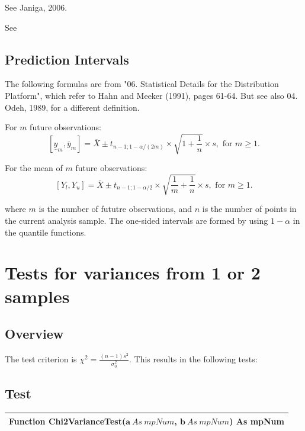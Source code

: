 See Janiga, 2006.

See \cite{odeh_tables_1980}



\subsection{Prediction Intervals}
The following formulas are from "06. Statistical Details for the Distribution Platform", which refer to  Hahn and Meeker (1991), pages 61-64. But see also 04. Odeh, 1989, for a different definition.

For $m$ future observations:
\begin{equation}
	\left[\underline{y}_m,\overline{y}_m \right] = \overline{X}\pm t_{n-1;1-\alpha/(2m)} \times \sqrt{1+\frac{1}{n}} \times s, \text{ for } m\geq1.
\end{equation}


For the mean of $m$ future observations:
\begin{equation}
	\left[Y_l,Y_u\right] = \overline{X}\pm t_{n-1;1-\alpha/2} \times \sqrt{\frac{1}{m}+\frac{1}{n}} \times s, \text{ for } m\geq1.
\end{equation}

where $m$ is the number of fututre observations, and $n$ is the number of points in the current analysis sample. The one-sided intervals are formed by using $1-\alpha$ in the quantile functions.





\newpage
\section{Tests for variances from 1 or 2 samples}
\label{1SampleChiSquareTest}


\subsection{Overview}
\label{1SampleChiSquareTestOverview}

The test criterion is $\chi^2=\frac{(n-1) s^2}{\sigma_0^2}$. This results in the following tests:

\subsection{Test}
\begin{tabular}{p{481pt}}
	\toprule
	\textsf{Function \textbf{Chi2VarianceTest}($\boldsymbol{a}\ As\ mpNum$, $\boldsymbol{b}\ As\ mpNum$) As mpNum}\index{Multiprecision Functions!Chi2VarianceTest} \\
	\bottomrule
\end{tabular}


